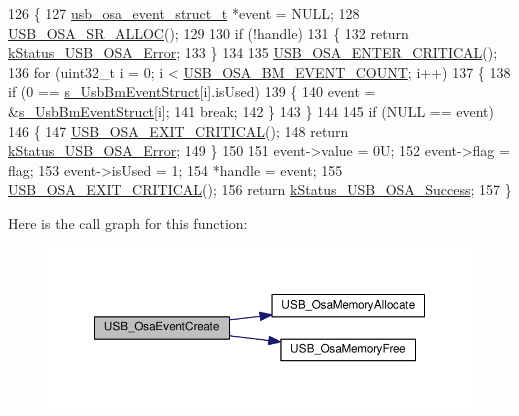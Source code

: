 \begin{DoxyCode}
126 \{
127     \hyperlink{struct__usb__osa__event__struct}{usb\_osa\_event\_struct\_t} *\textcolor{keyword}{event} = NULL;
128     \hyperlink{usb__osa__bm_8h_a8dbccf46cc2f8e3b5cece6a4a84f7ae8}{USB\_OSA\_SR\_ALLOC}();
129 
130     \textcolor{keywordflow}{if} (!handle)
131     \{
132         \textcolor{keywordflow}{return} \hyperlink{group__usb__os__abstraction_gga453ebd2f93aafb8c938c3a23c815f9bda40b794ea06e27b8ec1d67538f12eb350}{kStatus\_USB\_OSA\_Error};
133     \}
134 
135     \hyperlink{usb__osa__bm_8h_a0485f70bf9c9a22f0340f014bc567362}{USB\_OSA\_ENTER\_CRITICAL}();
136     \textcolor{keywordflow}{for} (uint32\_t i = 0; i < \hyperlink{usb__osa__bm_8c_af0b1e39abc5fdc23219b990ac3ef511f}{USB\_OSA\_BM\_EVENT\_COUNT}; i++)
137     \{
138         \textcolor{keywordflow}{if} (0 == \hyperlink{usb__osa__bm_8c_aba773069fb857f2303233899f250978e}{s\_UsbBmEventStruct}[i].isUsed)
139         \{
140             \textcolor{keyword}{event} = &\hyperlink{usb__osa__bm_8c_aba773069fb857f2303233899f250978e}{s\_UsbBmEventStruct}[i];
141             \textcolor{keywordflow}{break};
142         \}
143     \}
144 
145     \textcolor{keywordflow}{if} (NULL == event)
146     \{
147         \hyperlink{usb__osa__bm_8h_a5b8053eca19b6df666a26fad3b07f953}{USB\_OSA\_EXIT\_CRITICAL}();
148         \textcolor{keywordflow}{return} \hyperlink{group__usb__os__abstraction_gga453ebd2f93aafb8c938c3a23c815f9bda40b794ea06e27b8ec1d67538f12eb350}{kStatus\_USB\_OSA\_Error};
149     \}
150 
151     \textcolor{keyword}{event}->value = 0U;
152     \textcolor{keyword}{event}->flag = flag;
153     \textcolor{keyword}{event}->isUsed = 1;
154     *handle = event;
155     \hyperlink{usb__osa__bm_8h_a5b8053eca19b6df666a26fad3b07f953}{USB\_OSA\_EXIT\_CRITICAL}();
156     \textcolor{keywordflow}{return} \hyperlink{group__usb__os__abstraction_gga453ebd2f93aafb8c938c3a23c815f9bdab90805fb75297fda1ca60dbb2283f933}{kStatus\_USB\_OSA\_Success};
157 \}
\end{DoxyCode}


Here is the call graph for this function\-:
\nopagebreak
\begin{figure}[H]
\begin{center}
\leavevmode
\includegraphics[width=350pt]{group__usb__os__abstraction_gaf38d525580499ff2657303eb807efc61_cgraph}
\end{center}
\end{figure}




